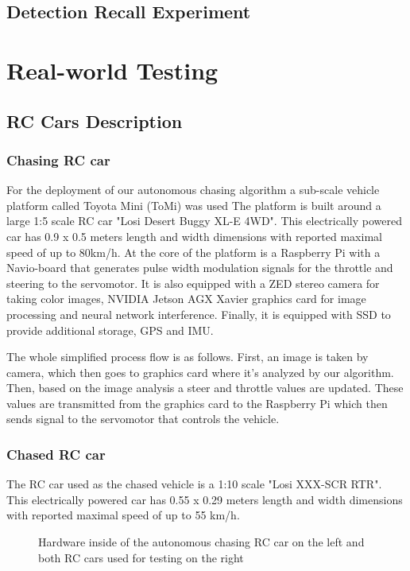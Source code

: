 \subsection{Detection Recall Experiment}

\section{Real-world Testing}
\subsection{RC Cars Description}
\subsubsection{Chasing RC car}
For the deployment of our autonomous chasing algorithm a sub-scale vehicle platform called Toyota Mini (ToMi) was used %
The platform is built around a large 1:5 scale RC car "Losi Desert Buggy XL-E 4WD". This electrically powered car has 0.9 x 0.5 meters length and width dimensions with reported maximal speed of up to 80km/h. At the core of the platform is a Raspberry Pi with a Navio-board that generates pulse width modulation signals for the throttle and steering to the servomotor. It is also equipped with a ZED stereo camera for taking color images, NVIDIA Jetson AGX Xavier graphics card for image processing and neural network interference. Finally, it is equipped with SSD to provide additional storage, GPS and IMU. \par
The whole simplified process flow is as follows. First, an image is taken by camera, which then goes to graphics card where it's analyzed by our algorithm. Then, based on the image analysis a steer and throttle values are updated. These values are transmitted from the graphics card to the Raspberry Pi which then sends signal to the servomotor that controls the vehicle.

\subsubsection{Chased RC car}
The RC car used as the chased vehicle is a 1:10 scale "Losi XXX-SCR RTR". This electrically powered car has 0.55 x 0.29 meters length and width dimensions with reported maximal speed of up to 55 km/h.

\begin{figure}[h!]
    \centering
    \qquad
    \caption{Hardware inside of the autonomous chasing RC car on the left and both RC cars used for testing on the right}%
    \label{fig:rc_cars}%
\end{figure}


